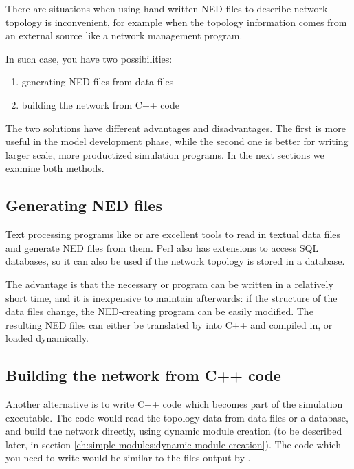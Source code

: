 There are situations when using hand-written NED files to describe
network topology is inconvenient, for example when
the topology information comes from
an external source like
a network management program.

In such case, you have two possibilities:

\begin{enumerate}
  \item{generating NED files from data files}
  \item{building the network from C++ code}
\end{enumerate}

The two solutions have different advantages and disadvantages.
The first is more useful in the model development phase, while
the second one is better for writing larger scale, more productized
simulation programs. In the next sections we examine both methods.



\subsection{Generating NED files}


Text processing programs like  or  are
excellent tools to read in textual data files and generate NED files
from them.  Perl also has extensions to
access SQL databases, so it can also be used if the network topology
is stored in a database.

The advantage is that the necessary  or 
program can be written in a relatively short time, and it is
inexpensive to maintain afterwards: if the structure of the data files
change, the NED-creating program can be easily modified. The
resulting NED files can either be translated by 
into C++ and compiled in, or loaded dynamically.


\subsection{Building the network from C++ code}

Another alternative is to write C++ code which becomes part of the
simulation executable. The code would read the topology data from data
files or a database, and build the network directly, using
dynamic module creation (to be described later, in section
\ref{ch:simple-modules:dynamic-module-creation}).
The code which you need to write would be similar to the 
files output by .

